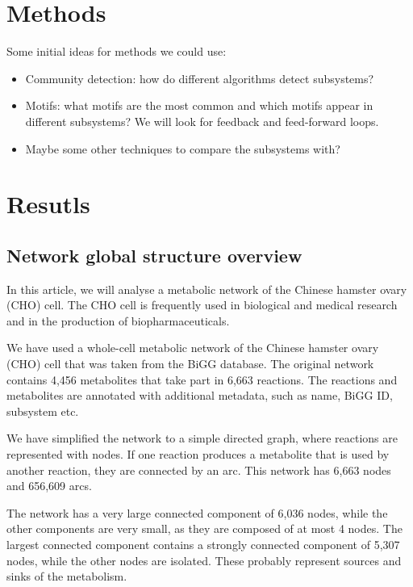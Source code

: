 \section{Methods}

Some initial ideas for methods we could use:

\begin{itemize}
\item
  Community detection: how do different algorithms detect subsystems?
\item
  Motifs: what motifs are the most common and which motifs appear in different
  subsystems? We will look for feedback and feed-forward loops.
\item
  Maybe some other techniques to compare the subsystems with?
\end{itemize}

\section{Resutls}
\label{sec:results}

\subsection{Network global structure overview}

In this article, we will analyse a metabolic network of the Chinese hamster
ovary (CHO) cell. The CHO cell is frequently used in biological and medical
research and in the production of biopharmaceuticals\cite{chocons}.

We have used a whole-cell metabolic network of the Chinese hamster ovary (CHO)
cell that was taken from the BiGG database\cite{bigg,chocons}. The original
network contains 4,456 metabolites that take part in 6,663 reactions. The
reactions and metabolites are annotated with additional metadata, such as name,
BiGG ID, subsystem etc.

We have simplified the network to a simple directed graph, where reactions are
represented with nodes. If one reaction produces a metabolite that is used by
another reaction, they are connected by an arc. This network has 6,663 nodes and
656,609 arcs.

The network has a very large connected component of 6,036 nodes, while the other
components are very small, as they are composed of at most 4 nodes. The largest
connected component contains a strongly connected component of 5,307 nodes,
while the other nodes are isolated. These probably represent sources and sinks
of the metabolism.

